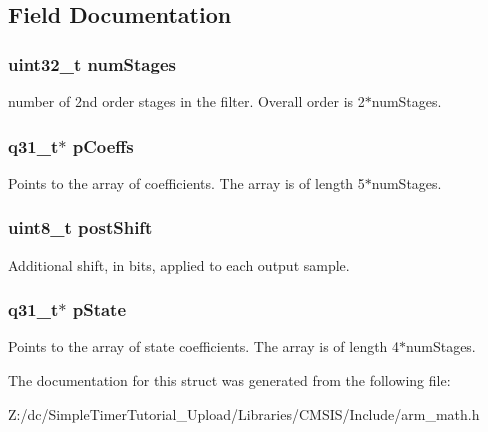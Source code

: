 \subsection{Field Documentation}
\hypertarget{structarm__biquad__casd__df1__inst__q31_aed9c8a6224cd149e8e12b17b25b9b767}{
\subsubsection[{num\-Stages}]{\setlength{\rightskip}{0pt plus 5cm}uint32\-\_\-t num\-Stages}}\label{structarm__biquad__casd__df1__inst__q31_aed9c8a6224cd149e8e12b17b25b9b767}
number of 2nd order stages in the filter. Overall order is 2$\ast$num\-Stages. \hypertarget{structarm__biquad__casd__df1__inst__q31_a68888e36167d81cb7836db10367a1682}{
\subsubsection[{p\-Coeffs}]{\setlength{\rightskip}{0pt plus 5cm}q31\-\_\-t$\ast$ p\-Coeffs}}\label{structarm__biquad__casd__df1__inst__q31_a68888e36167d81cb7836db10367a1682}
Points to the array of coefficients. The array is of length 5$\ast$num\-Stages. \hypertarget{structarm__biquad__casd__df1__inst__q31_a74050e9f36542bd56f4052381a82ae8f}{
\subsubsection[{post\-Shift}]{\setlength{\rightskip}{0pt plus 5cm}uint8\-\_\-t post\-Shift}}\label{structarm__biquad__casd__df1__inst__q31_a74050e9f36542bd56f4052381a82ae8f}
Additional shift, in bits, applied to each output sample. \hypertarget{structarm__biquad__casd__df1__inst__q31_adee4ba3ee8869865af7d8fa08ca913d6}{
\subsubsection[{p\-State}]{\setlength{\rightskip}{0pt plus 5cm}q31\-\_\-t$\ast$ p\-State}}\label{structarm__biquad__casd__df1__inst__q31_adee4ba3ee8869865af7d8fa08ca913d6}
Points to the array of state coefficients. The array is of length 4$\ast$num\-Stages. 

The documentation for this struct was generated from the following file\-:\begin{DoxyCompactItemize}
\item 
Z\-:/dc/\-Simple\-Timer\-Tutorial\-\_\-\-Upload/\-Libraries/\-C\-M\-S\-I\-S/\-Include/arm\-\_\-math.\-h\end{DoxyCompactItemize}
